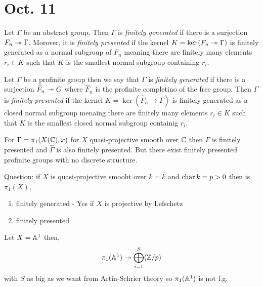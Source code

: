 \documentclass[12pt]{article}
\begin{document}
\section{Oct. 11}

\begin{defn}
Let $\Gamma$ be an abstract group. Then $\Gamma$ is \textit{finitely generated} if there is a surjection $F_n \twoheadrightarrow \Gamma$. Morover, it is \textit{finitely presented} if the kernel $K = \ker{(F_n \twoheadrightarrow\Gamma)}$ is finitely generated as a normal subgroup of $F_n$ meaning there are finitely many elements $r_i \in K$ such that $K$ is the smallest normal subgroup containing $r_i$.  
\end{defn}

\begin{defn}
Let $\Gamma$ be a profinite group then we say that $\Gamma$ is \textit{finitely generated} if there is a surjection $\widehat{F}_n \twoheadrightarrow G$ where $\widehat{F}_n$ is the profinite completino of the free group. Then $\Gamma$ is \textit{finitely presented} if the kernel $K = \ker{(\widehat{F}_n \to \Gamma)}$ is finitely generated as a closed normal subgroup menaing there are finitely many elements $r_i \in K$ such that $K$ is the smallest closed normal subgroup containig $r_i$. 
\end{defn}

\begin{example}
For $\Gamma = \pi_1(X(\mathbb{C}), x)$ for $X$ quasi-projective smooth over $\mathbb{C}$ then $\Gamma$ is finitely presented and $\widehat{\Gamma}$ is also finitely presented. But there exist finitely presented profinite groups with no discrete structure.
\end{example}

\begin{rmk}
Question: if $X$ is quasi-projective smooht over $k = \bar{k}$ and $\operatorname{\mathrm{char}}{k} = p > 0$ then is $\pi_1(X)$,
\begin{enumerate}
\item finitely generated - Yes if $X$ is projective by Lefschetz 
\item finitely presented 
\end{enumerate}
\end{rmk}

\begin{example}
Let $X = \mathbb{A}^1$ then,
\[ \pi_1(\mathbb{A}^1) \twoheadrightarrow \bigoplus_{i = 1}^S (\mathbb{Z} / p) \]
with $S$ as big as we want from Artin-Schrier theory so $\pi_1(\mathbb{A}^1)$ is not f.g.
\end{example}
\end{document}
